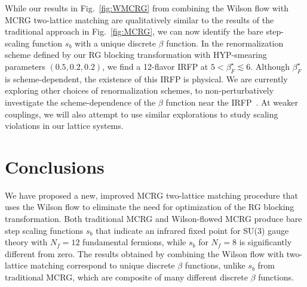 \documentclass{PoS}
\newcommand{\be}{\ensuremath{\beta} }
\newcommand{\lsim}{\ensuremath{\lesssim} }
\newcommand{\fig}[1]{Fig.~\ref{#1}}
\begin{document}
While our results in \fig{fig:WMCRG} from combining the Wilson flow with MCRG two-lattice matching are qualitatively similar to the results of the traditional approach in \fig{fig:MCRG}, we can now identify the bare step-scaling function $s_b$ with a unique discrete \be function.
In the renormalization scheme defined by our RG blocking transformation with HYP-smearing parameters $(0.5, 0.2, 0.2)$, we find a 12-flavor IRFP at $5 < \be_F^{\star} \lsim 6$.
Although $\be_F^{\star}$ is scheme-dependent, the existence of this IRFP is physical.
We are currently exploring other choices of renormalization schemes, to non-perturbatively investigate the scheme-dependence of the \be function near the IRFP~\cite{Ryttov:2012nt}.
At weaker couplings, we will also attempt to use similar explorations to study scaling violations in our lattice systems.



\section{Conclusions} %
We have proposed a new, improved MCRG two-lattice matching procedure that uses the Wilson flow to eliminate the need for optimization of the RG blocking transformation.
Both traditional MCRG and Wilson-flowed MCRG produce bare step scaling functions $s_b$ that indicate an infrared fixed point for SU(3) gauge theory with $N_f = 12$ fundamental fermions, while $s_b$ for $N_f = 8$ is significantly different from zero.
The results obtained by combining the Wilson flow with two-lattice matching correspond to unique discrete \be functions, unlike $s_b$ from traditional MCRG, which are composite of many different discrete \be functions.





\end{document}
